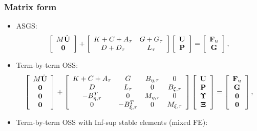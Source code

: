 \begin{frame}
\frametitle{Matrix form}
\begin{itemize}
\item<1-> ASGS:
\begin{equation*}
\left[\begin{array}{c}
M\dot{{\bf U}}\\
\mathbf{0}
\end{array}\right]+\left[\begin{array}{cc}
K+C+A_\tau&G+G_\tau\\
D+D_\tau&L_\tau
\end{array}\right]\left[\begin{array}{c}
{\bf U}\\
{\bf P}
\end{array}\right]=\left[\begin{array}{c}
{\bf F}_u\\
\mathbf{G}
\end{array}\right],
\end{equation*}
\item<2-> Term-by-term OSS:
\begin{equation*}
\left[\begin{array}{c}
M\dot{{\bf U}}\\
\mathbf{0}\\
\mathbf{0}\\
\mathbf{0}
\end{array}\right]+\left[\begin{array}{cccc}
K+C+A_\tau&G&B_{\eta,\tau}&0\\
D&L_\tau&0&B_{\xi,\tau}\\
-B_{\eta,\tau}^T&0&M_{\eta,\tau}&0\\
0&-B_{\xi,\tau}^T&0&M_{\xi,\tau}
\end{array}\right]\left[\begin{array}{c}
{\bf U}\\
{\bf P}\\
\boldsymbol{\Upsilon}\\
{\boldsymbol{\Xi}}
\end{array}\right]=\left[\begin{array}{c}
{\bf F}_u\\
\mathbf{G}\\
\mathbf{0}\\
\mathbf{0}
\end{array}\right],
\end{equation*}
\item<3-> Term-by-term OSS with Inf-sup stable elements (mixed FE):

\end{itemize}
\end{frame}
